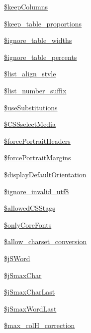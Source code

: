 \begin{DoxyCompactItemize}
\item 
\hyperlink{classm_p_d_f_ae46f528caa6c0f23c7d8213880c8bc9d}{\$keep\-Columns}
\item 
\hyperlink{classm_p_d_f_a08004c9ce33e1ca6f55e5ebfbeb74586}{\$keep\-\_\-table\-\_\-proportions}
\item 
\hyperlink{classm_p_d_f_a14c51b32c35d54e9891759b00bc884f7}{\$ignore\-\_\-table\-\_\-widths}
\item 
\hyperlink{classm_p_d_f_ae94526b3ad15593dc6f68963af27dfbe}{\$ignore\-\_\-table\-\_\-percents}
\item 
\hyperlink{classm_p_d_f_a5382dd58dbc66ffe769ce3604997050c}{\$list\-\_\-align\-\_\-style}
\item 
\hyperlink{classm_p_d_f_a50ca5c3a551a5451d52fa6173f548249}{\$list\-\_\-number\-\_\-suffix}
\item 
\hyperlink{classm_p_d_f_a34f67edd17b6117b6adc30edb0220a9f}{\$use\-Substitutions}
\item 
\hyperlink{classm_p_d_f_a19c7a2fe29b1d85b5cc4ff6eaa355d31}{\$\-C\-S\-Sselect\-Media}
\item 
\hyperlink{classm_p_d_f_aa0c7644f18c1d1b4ba6069cad409b5d2}{\$force\-Portrait\-Headers}
\item 
\hyperlink{classm_p_d_f_a0a6e7bacb6f6abf9a80cd32b7d58584d}{\$force\-Portrait\-Margins}
\item 
\hyperlink{classm_p_d_f_aede55ecdea0dd5d177b9af5a2b50ce6e}{\$display\-Default\-Orientation}
\item 
\hyperlink{classm_p_d_f_a954b8d8b9df5b7ddfad5e1baf230b071}{\$ignore\-\_\-invalid\-\_\-utf8}
\item 
\hyperlink{classm_p_d_f_a88b39fc02010c197220d3136486f51fc}{\$allowed\-C\-S\-Stags}
\item 
\hyperlink{classm_p_d_f_a63b19fe6a1a3fe28f1213d5671399e55}{\$only\-Core\-Fonts}
\item 
\hyperlink{classm_p_d_f_a675f374113c0c45cb77f66bdb234848d}{\$allow\-\_\-charset\-\_\-conversion}
\item 
\hyperlink{classm_p_d_f_a342ed02df86731efec20826d3b48cb0c}{\$j\-S\-Word}
\item 
\hyperlink{classm_p_d_f_ae0e54411c78ddecf76421a0d6715cf33}{\$j\-Smax\-Char}
\item 
\hyperlink{classm_p_d_f_ac8374ddeb1ecf79ae2aab64e201a5574}{\$j\-Smax\-Char\-Last}
\item 
\hyperlink{classm_p_d_f_a91548fde8656675d7464d5b1a2e9946b}{\$j\-Smax\-Word\-Last}
\item 
\hyperlink{classm_p_d_f_a0a7f7338a89569e4d23e15ef17a6a6e2}{\$max\-\_\-col\-H\-\_\-correction}

\end{DoxyCompactItemize}
